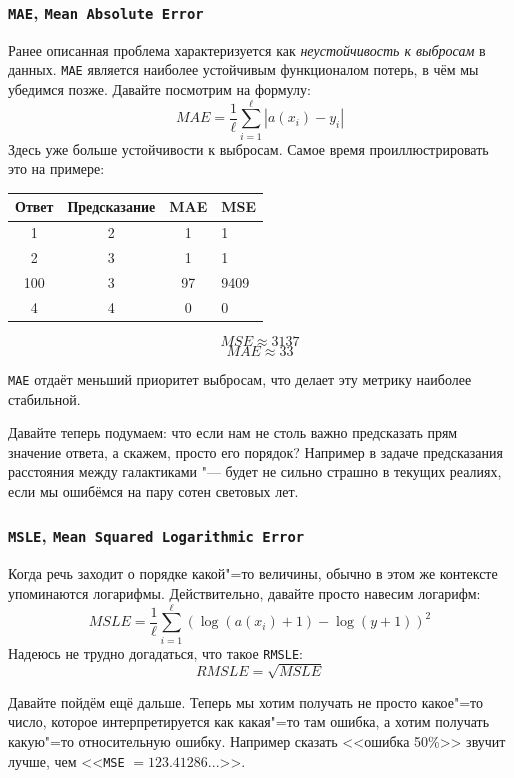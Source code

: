 \subsubsection*{\texttt{MAE}, \texttt{Mean Absolute Error}}
Ранее описанная проблема характеризуется как \textit{неустойчивость к
выбросам} в данных. \texttt{MAE} является наиболее устойчивым 
функционалом потерь, в чём мы убедимся позже. Давайте посмотрим на 
формулу:
\[
MAE = \frac{1}{\ell}\sum_{i=1}^\ell |a(x_i) - y_i|
\]
Здесь уже больше устойчивости к выбросам. Самое время проиллюстрировать
это на примере:
\begin{table}[H]
\begin{tabular}{|c|c|c|l|}
\hline
Ответ & Предсказание & MAE & MSE  \\ \hline
1     & 2            & 1   & 1    \\ \hline
2     & 3            & 1   & 1    \\ \hline
100   & 3            & 97  & 9409 \\ \hline
4     & 4            & 0   & 0    \\ \hline
\end{tabular}
\end{table}

\[
MSE \approx 3137
\]
\[
MAE \approx 33
\]

\texttt{MAE} отдаёт меньший приоритет выбросам, что делает эту метрику 
наиболее стабильной.

Давайте теперь подумаем: что если нам не столь важно предсказать прям 
значение ответа, а скажем, просто его порядок? Например в задаче предсказания расстояния между галактиками "--- будет не сильно страшно в 
текущих реалиях, если мы ошибёмся на пару сотен световых лет.

\subsubsection*{\texttt{MSLE}, \texttt{Mean Squared Logarithmic Error}}
Когда речь заходит о порядке какой"=то величины, обычно в этом же 
контексте упоминаются логарифмы. Действительно, давайте просто навесим
логарифм:
\[
MSLE = \frac{1}{\ell}\sum_{i=1}^\ell (\log(a(x_i) + 1) - \log(y+1))^2
\]
Надеюсь не трудно догадаться, что такое \texttt{RMSLE}:
\[
RMSLE = \sqrt{MSLE}
\]

Давайте пойдём ещё дальше. Теперь мы хотим получать не просто какое"=то
число, которое интерпретируется как какая"=то там ошибка, а хотим получать какую"=то относительную ошибку. Например сказать <<ошибка
50\%>> звучит лучше, чем <<\texttt{MSE} $= 123.41286...$>>.

